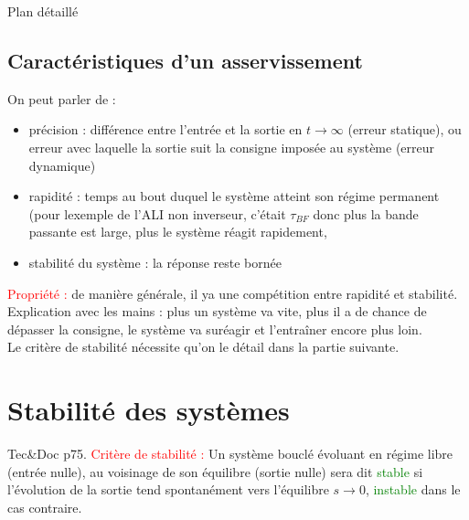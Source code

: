 \begin{reportBlock}{Plan détaillé}
  \subsection{Caractéristiques d'un asservissement} 
  On peut parler de :
  \begin{itemize}
      \item précision : différence entre l'entrée et la sortie en $t\rightarrow\infty$ (erreur statique), ou erreur avec laquelle la sortie suit la consigne imposée au système (erreur dynamique)
      \item rapidité : temps au bout duquel le système atteint son régime permanent (pour lexemple de l'ALI non inverseur, c'était $\tau_{BF}$ donc plus la bande passante est large, plus le système réagit rapidement,
      \item stabilité du système : la réponse reste bornée
  \end{itemize}
  \textcolor{red}{Propriété :} de manière générale, il ya une compétition entre rapidité et stabilité. Explication avec les mains : plus un système va vite, plus il a de chance de dépasser la consigne, le système va suréagir et l'entraîner encore plus loin.\\

  Le critère de stabilité nécessite qu'on le détail dans la partie suivante.
  
  \section{Stabilité des systèmes}
  Tec\&Doc p75. \textcolor{red}{Critère de stabilité :} Un système bouclé évoluant en régime libre (entrée nulle), au voisinage de son équilibre (sortie nulle) sera dit \textcolor{green}{stable} si l'évolution de la sortie tend spontanément vers l'équilibre $s\rightarrow0$, \textcolor{green}{instable} dans le cas contraire.\\

\end{reportBlock}
